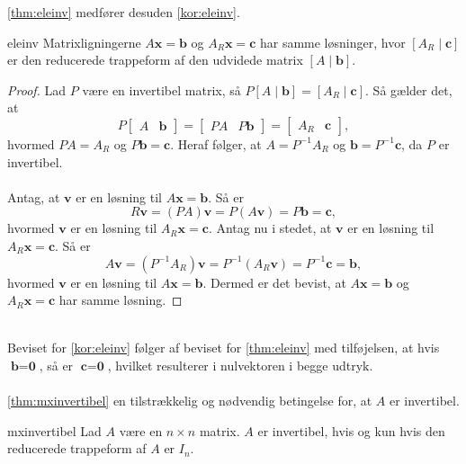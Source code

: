 %
\newpage
\noindent
%
\ref{thm:eleinv} medfører desuden \ref{kor:eleinv}.
% 
\begin{kor}{}{eleinv}
Matrixligningerne $A\textbf{x}=\textbf{b}$ og $A_R\textbf{x}=\textbf{c}$ har samme løsninger, hvor 
$[A_R \mid \textbf{c}]$
er den reducerede trappeform af den udvidede matrix 
$[A \mid\textbf{b}].$
\end{kor}\noindent
%
\begin{proof}
Lad $P$ være en invertibel matrix, så 
$P[A \mid\textbf{b}]
=
[A_R \mid \textbf{c}]
$.
Så gælder det, at 
$$
P
\begin{bmatrix}
A & \textbf{b}
\end{bmatrix}
=
\begin{bmatrix}
PA & P\textbf{b}
\end{bmatrix}
=
\begin{bmatrix}
A_R & \textbf{c}
\end{bmatrix},
$$
hvormed $PA=A_R$ og $P\textbf{b}=\textbf{c}$.
Heraf følger, at $A=P^{-1}A_R$ og $\textbf{b}=P^{-1}\textbf{c}$, da $P$ er invertibel. 
\\\\
Antag, at $\textbf{v}$ er en løsning til $A\textbf{x}=\textbf{b}$. Så er
$$
R\textbf{v}=(PA)\textbf{v}=P(A\textbf{v})=P\textbf{b}=\textbf{c},
$$
hvormed $\textbf{v}$ er en løsning til $A_R\textbf{x}=\textbf{c}$. 
Antag nu i stedet, at $\textbf{v}$ er en løsning til $A_R\textbf{x}=\textbf{c}$. Så er
$$
A\textbf{v}=(P^{-1}A_R)\textbf{v}=P^{-1}(A_R\textbf{v})=P^{-1}\textbf{c}=\textbf{b},
$$
hvormed $\textbf{v}$ er en løsning til $A\textbf{x}=\textbf{b}$. 
Dermed er det bevist, at $A\textbf{x}=\textbf{b}$ og $A_R\textbf{x}=\textbf{c}$ har samme løsning.

\end{proof}
\\
Beviset for \ref{kor:eleinv} følger af beviset for \ref{thm:eleinv} med tilføjelsen, at hvis $\textbf{b}=\textbf{0}$, så er $\textbf{c}=\textbf{0}$, hvilket resulterer i nulvektoren i begge udtryk.\\\\
%
\ref{thm:mxinvertibel}  en tilstrækkelig og nødvendig betingelse for, at $A$ er invertibel.
%
\begin{thm}{}{mxinvertibel}
Lad $A$ være en $n \times n$ matrix. 
$A$ er invertibel, hvis og kun hvis den reducerede trappeform af $A$ er $I_n$.
\end{thm}
%
